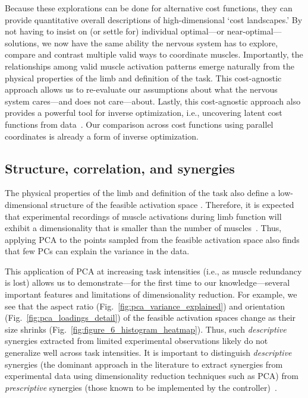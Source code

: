 \documentclass[letterpaper]{article}
\begin{document}
Because these explorations can be done for alternative cost functions, they can provide quantitative overall descriptions of high-dimensional `cost landscapes.'
By not having to insist on (or settle for) individual optimal---or near-optimal---solutions, we now have the same ability the nervous system has to explore, compare and contrast multiple valid ways to coordinate muscles. Importantly, the relationships among valid muscle activation patterns emerge naturally from the physical properties of the limb and definition of the task. This  cost-agnostic approach allows us to re-evaluate our assumptions about what the nervous system cares---and does not care---about. Lastly, this cost-agnostic approach also provides a powerful tool for inverse optimization, i.e., uncovering latent cost functions from data~\cite{tsirakos1997inverse}. Our comparison across cost functions using parallel coordinates is already a form of inverse optimization.

\subsection*{Structure, correlation, and synergies}

The physical properties of the limb and definition of the task also define a low-dimensional structure of the feasible activation space \cite{valero-cuevas2015fundamentals}. Therefore, it is expected that experimental recordings of muscle activations during limb function will exhibit a dimensionality that is smaller than the number of muscles~\cite{kutch2012challenges,alessandro2013musclesynergies}. Thus, applying PCA to the points sampled from the feasible activation space also finds that few PCs can explain the variance in the data.

This application of PCA at increasing task intensities (i.e., as muscle redundancy is lost) allows us to demonstrate---for the first time to our knowledge---several important features and limitations of dimensionality reduction. For example, we see that the aspect ratio (Fig.~\ref{fig:pca_variance_explained}) and orientation (Fig.~\ref{fig:pca_loadings_detail}) of the feasible activation spaces change as their size shrinks (Fig.~\ref{fig:figure_6_histogram_heatmap}).
Thus, such \emph{descriptive} synergies extracted from limited experimental observations likely do not generalize well across task intensities.
It is important to distinguish \emph{descriptive} synergies (the dominant approach in the literature to extract synergies from experimental data using dimensionality reduction techniques such as PCA) from \emph{prescriptive} synergies (those  known to be implemented by the controller)~\cite{valero-cuevas2015fundamentals}.
\end{document}
